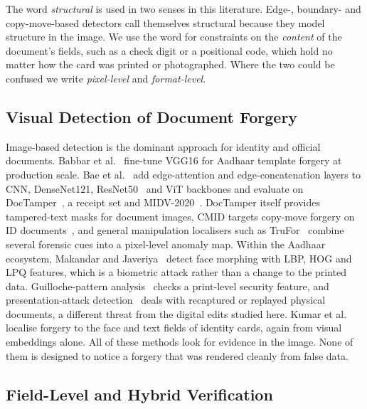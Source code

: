 \documentclass[conference]{IEEEtran}
\begin{document}
The word \emph{structural} is used in two senses in this literature.
Edge-, boundary- and copy-move-based detectors call themselves
structural because they model structure in the image. We use the word
for constraints on the \emph{content} of the document's fields, such as
a check digit or a positional code, which hold no matter how the card
was printed or photographed. Where the two could be confused we write
\emph{pixel-level} and \emph{format-level}.

\subsection{Visual Detection of Document Forgery}

Image-based detection is the dominant approach for identity and
official documents. Babbar et al.~\cite{babbar} fine-tune VGG16 for
Aadhaar template forgery at production scale. Bae et
al.~\cite{bae} add edge-attention and edge-concatenation layers to CNN,
DenseNet121, ResNet50~\cite{resnet} and ViT backbones and evaluate on
DocTamper~\cite{doctamper}, a receipt set and MIDV-2020~\cite{midv}.
DocTamper itself provides tampered-text masks for document images, CMID
targets copy-move forgery on ID documents~\cite{cmid}, and general
manipulation localisers such as TruFor~\cite{trufor} combine several
forensic cues into a pixel-level anomaly map. Within the Aadhaar
ecosystem, Makandar and Javeriya~\cite{morph} detect face morphing with
LBP, HOG and LPQ features, which is a biometric attack rather than a
change to the printed data. Guilloche-pattern analysis~\cite{guilloche}
checks a print-level security feature, and presentation-attack
detection~\cite{pad} deals with recaptured or replayed physical
documents, a different threat from the digital edits studied here.
Kumar et al.~\cite{flid} localise forgery to the face and text fields
of identity cards, again from visual embeddings alone. All of these
methods look for evidence in the image. None of them is
designed to notice a forgery that was rendered cleanly from false data.

\subsection{Field-Level and Hybrid Verification}
\end{document}
